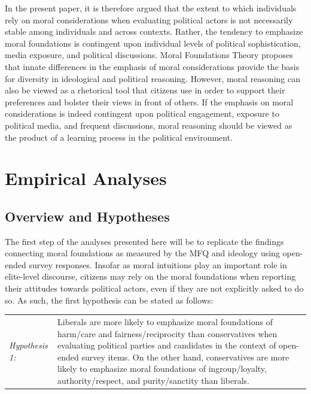 \documentclass[12pt]{article}
\begin{document}
In the present paper, it is therefore argued that the extent to which individuals rely on moral considerations when evaluating political actors is not necessarily stable among individuals and across contexts. Rather, the tendency to emphasize moral foundations is contingent upon individual levels of political sophistication, media exposure, and political discussions. Moral Foundations Theory proposes that innate differences in the emphasis of moral considerations provide the basis for diversity in ideological and political reasoning. However, moral reasoning can also be viewed as a rhetorical tool that citizens use in order to support their preferences and bolster their views in front of others. If the emphasis on moral considerations is indeed contingent upon political engagement, exposure to political media, and frequent discussions, moral reasoning should be viewed as the product of a learning process in the political environment.


\section{Empirical Analyses}

\subsection{Overview and Hypotheses}

The first step of the analyses presented here will be to replicate the findings connecting moral foundations as measured by the MFQ and ideology using open-ended survey responses. Insofar as moral intuitions play an important role in elite-level discourse, citizens may rely on the moral foundations when reporting their attitudes towards political actors, even if they are not explicitly asked to do so. As such, the first hypothesis can be stated as follows:

\vspace{0.3cm}
\begin{tabular}{lp{12cm}}
\textsl{Hypothesis 1:} & Liberals are more likely to emphasize moral foundations of harm/care and fairness/reciprocity  than conservatives when evaluating political parties and candidates in the context of open-ended survey items. On the other hand, conservatives are more likely to emphasize moral foundations of ingroup/loyalty, authority/respect, and purity/sanctity than liberals.
\end{tabular}
\vspace{0.5cm}
\end{document}

